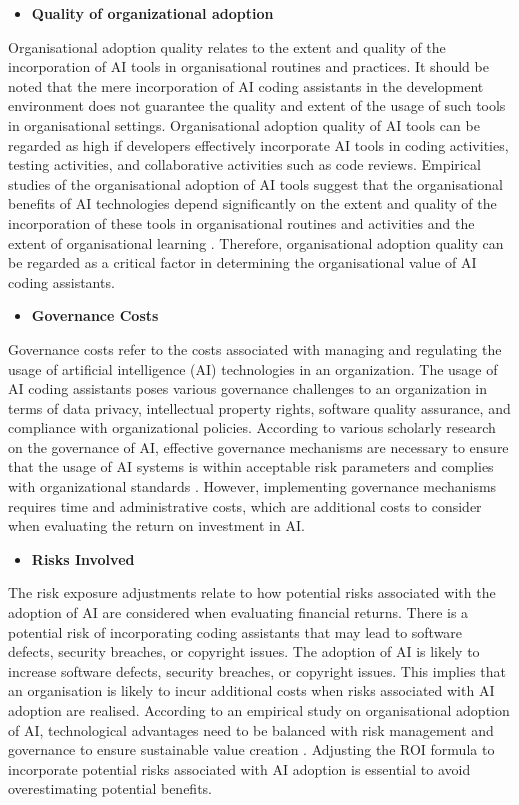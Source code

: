 \begin{itemize}
	\item \textbf{Quality of organizational adoption} 
\end{itemize}
Organisational adoption quality relates to the extent and quality of the incorporation of AI tools in organisational routines and practices. It should be noted that the mere incorporation of AI coding assistants in the development environment does not guarantee the quality and extent of the usage of such tools in organisational settings. Organisational adoption quality of AI tools can be regarded as high if developers effectively incorporate AI tools in coding activities, testing activities, and collaborative activities such as code reviews. Empirical studies of the organisational adoption of AI tools suggest that the organisational benefits of AI technologies depend significantly on the extent and quality of the incorporation of these tools in organisational routines and activities and the extent of organisational learning \autocite{An2024}. Therefore, organisational adoption quality can be regarded as a critical factor in determining the organisational value of AI coding assistants.

\begin{itemize}
	\item \textbf{Governance Costs} 
\end{itemize}
Governance costs refer to the costs associated with managing and regulating the usage of artificial intelligence (AI) technologies in an organization. The usage of AI coding assistants poses various governance challenges to an organization in terms of data privacy, intellectual property rights, software quality assurance, and compliance with organizational policies. According to various scholarly research on the governance of AI, effective governance mechanisms are necessary to ensure that the usage of AI systems is within acceptable risk parameters and complies with organizational standards \autocite{Schneider2023}. However, implementing governance mechanisms requires time and administrative costs, which are additional costs to consider when evaluating the return on investment in AI.

\begin{itemize}
	\item \textbf{Risks Involved} 
\end{itemize}
The risk exposure adjustments relate to how potential risks associated with the adoption of AI are considered when evaluating financial returns. There is a potential risk of incorporating coding assistants that may lead to software defects, security breaches, or copyright issues. The adoption of AI is likely to increase software defects, security breaches, or copyright issues. This implies that an organisation is likely to incur additional costs when risks associated with AI adoption are realised. According to an empirical study on organisational adoption of AI, technological advantages need to be balanced with risk management and governance to ensure sustainable value creation \autocite{Schneider2023}. Adjusting the ROI formula to incorporate potential risks associated with AI adoption is essential to avoid overestimating potential benefits.

